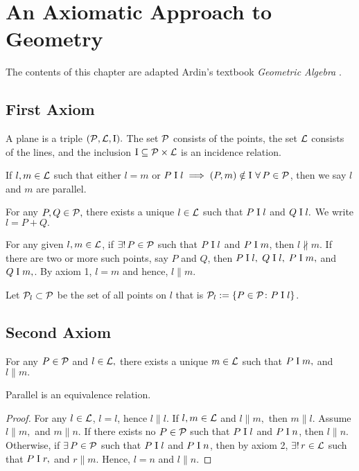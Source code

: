 \chapter{An Axiomatic Approach to Geometry}

The contents of this chapter are adapted Ardin's textbook \textit{Geometric Algebra} \cite{artin}.

\section{First Axiom}

\begin{definition}
    A plane is a triple $(\mathcal{P},\mathcal{L},\text{I}).$ The set $\mathcal{P}$ consists of the points, the set $\mathcal{L}$ consists of the lines, and the inclusion $\text{I} \subseteq \mathcal{P} \times \mathcal{L}$ is an incidence relation. 
\end{definition}

\begin{definition}
    If $l,m \in \mathcal{L}$ such that either $l = m$ or $P \ic l \implies (P,m) \notin \icset \ \forall\, P \in \pt$, then we say $l$ and $m$ are parallel.
\end{definition}

\begin{axiom}[1]
    For any $P,Q \in \mathcal{P},$ there exists a unique $l \in \mathcal{L}$ such that $P \mathrel\text{I} l$ and $Q \mathrel\text{I} l.$ We write $l=P+Q.$
\end{axiom}

For any given $l,m \in \mathcal{L}$, if $\exists!\,P \in \mathcal{P}$ such that $P \mathrel\text{I} l$ and $P \mathrel\text{I} m$, then $l \nparallel m$. If there are two or more such points, say $P$ and $Q$, then $P \mathrel\text{I} l,$ $Q \mathrel\text{I} l,$ $P \mathrel\text{I} m,$ and $Q \mathrel\text{I} m,$. By axiom 1, $l=m$ and hence, $l \parallel m$.

\vspace{1ex}

\noindent
Let $\mathcal{P}_l \subset \mathcal{P}$ be the set of all points on $l$ that is $\mathcal{P}_l := \{ P \in \mathcal{P} \colon P \mathrel\text{I} l\}$.

\section{Second Axiom}

\begin{axiom}[2]
    For any $P \in \mathcal{P}$ and $l \in \mathcal{L},$ there exists a unique $m \in \mathcal{L}$ such that $P \mathrel\text{I} m,$ and $l \parallel m.$
\end{axiom}

\begin{theorem}
    Parallel is an equivalence relation.
\end{theorem}
\begin{proof}
    For any $l \in \mathcal{L}$, $l=l$, hence $l \parallel l.$ If $l,m \in \mathcal{L}$ and $l \parallel m,$ then $m \parallel l.$ Assume $l \parallel m,$ and $m \parallel n$. If there exists no $P \in \mathcal{P}$ such that $P \mathrel\text{I} l$ and $P \mathrel\text{I} n$, then $l \parallel n$. Otherwise, if $\exists\, P \in \mathcal{P}$ such that $P \mathrel\text{I} l$ and $P \mathrel\text{I} n$, then by axiom 2, $\exists!\, r \in \mathcal{L}$ such that $P \mathrel\text{I} r,$ and $ r \parallel m.$ Hence, $l=n$ and $l \parallel n.$
\end{proof}

